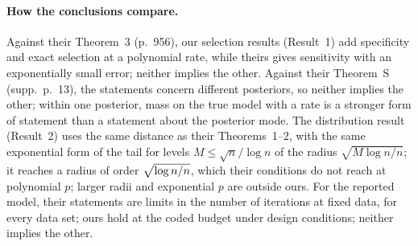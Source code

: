 \paragraph{How the conclusions compare.}\label{sec:SL-concl} Against their Theorem~3 (p.~956), our selection results (Result~1) add specificity and
exact selection at a polynomial rate, while theirs gives sensitivity with an exponentially small error; neither implies
the other. Against their Theorem~S (supp.\ p.~13), the statements concern different posteriors, so neither implies the other; within one posterior,
mass on the true model with a rate is a stronger form of statement than a statement about the posterior mode. The
distribution result (Result~2) uses the same distance as their Theorems~1--2, with the same exponential form of the tail for
levels $M\le\sqrt n/\log n$ of the radius $\sqrt{M\log n/n}$; it reaches a radius of order $\sqrt{\log n/n}$, which their conditions do not reach at polynomial $p$;
larger radii and exponential $p$ are outside ours. For the reported model, their
statements are limits in the number of iterations at fixed data, for every data set; ours hold at the coded budget
under design conditions; neither implies the other.

